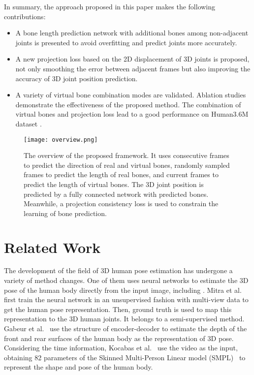 \documentclass[journal]{IEEEtran}
\begin{document}
In summary, the approach proposed in this paper makes the following contributions: 
\begin{itemize}
	\vspace{-0pt}
	\item A bone length prediction network with additional bones among non-adjacent joints is presented to avoid overfitting and predict joints more accurately.
	\vspace{-0pt}
	\item A new projection loss based on the 2D displacement of 3D joints is proposed, not only smoothing the error between adjacent frames but also improving the accuracy of 3D joint position prediction.
	\vspace{-0pt}
	\item A variety of virtual bone combination modes are validated. Ablation studies demonstrate the effectiveness of the proposed method. The combination of virtual bones and projection loss lead to a good performance on Human3.6M dataset \cite{Catalin2014Human3}.
	\vspace{-0pt}
\end{itemize}


\begin{figure}
	\centering
	\texttt{[image: overview.png]}
	\vspace{-2pt}
	\caption{The overview of the proposed framework. It uses consecutive frames to predict the direction of real and virtual bones, randomly sampled frames to predict the length of real bones, and current frames to predict the length of virtual bones. The 3D joint position is predicted by a fully connected network with predicted bones. Meanwhile, a projection consistency loss is used to constrain the learning of bone prediction.}
	\label{fig:overview}
	\vspace{-0pt}
\end{figure}


\section{Related Work}
The development of the field of 3D human pose estimation has undergone a variety of method changes. One of them uses neural networks to estimate the 3D pose of the human body directly from the input image, including  \cite{2019Multiview,2020Moulding,2020VIBE}. Mitra et al. \cite{2019Multiview} first train the neural network in an unsupervised fashion with multi-view data to get the human pose representation. Then, ground truth is used to map this representation to the 3D human joints. It belongs to a semi-supervised method. Gabeur et al.~\cite{2020Moulding} use the structure of encoder-decoder to estimate the depth of the front and rear surfaces of the human body as the representation of 3D pose. Considering the time information, Kocabas et al.~\cite{2020VIBE} use the video as the input, obtaining 82 parameters of the Skinned Multi-Person Linear model (SMPL)~\cite{loper2015smpl} to represent the shape and pose of the human body.
\end{document}
